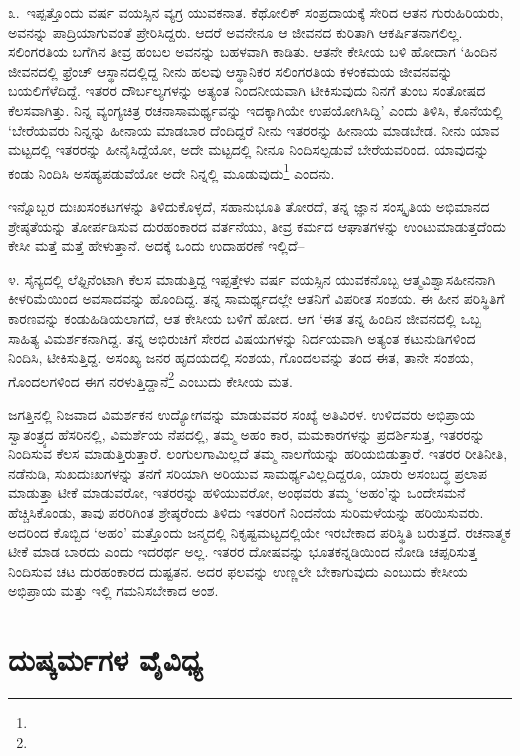 ೩.\ ಇಪ್ಪತ್ತೊಂದು ವರ್ಷ ವಯಸ್ಸಿನ ವ್ಯಗ್ರ ಯುವಕನಾತ. ಕೆಥೋಲಿಕ್ ಸಂಪ್ರದಾಯಕ್ಕೆ ಸೇರಿದ ಆತನ ಗುರುಹಿರಿಯರು, ಅವನನ್ನು ಪಾದ್ರಿಯಾಗುವಂತೆ ಪ್ರೇರಿಸಿದ್ದರು. ಆದರೆ ಅವನೇನೂ ಆ ಜೀವನದ ಕುರಿತಾಗಿ ಆಕರ್ಷಿತನಾಗಲಿಲ್ಲ. ಸಲಿಂಗರತಿಯ ಬಗೆಗಿನ ತೀವ್ರ ಹಂಬಲ ಅವನನ್ನು ಬಹಳವಾಗಿ ಕಾಡಿತು. ಆತನೇ ಕೇಸೀಯ ಬಳಿ ಹೋದಾಗ ‘ಹಿಂದಿನ ಜೀವನದಲ್ಲಿ ಫ್ರೆಂಚ್ ಆಸ್ಥಾನದಲ್ಲಿದ್ದ ನೀನು ಹಲವು ಆಸ್ಥಾನಿಕರ ಸಲಿಂಗರತಿಯ ಕಳಂಕಮಯ ಜೀವನವನ್ನು ಬಯಲಿಗೆಳೆದಿದ್ದೆ. ಇತರರ ದೌರ್ಬಲ್ಯಗಳನ್ನು ಅತ್ಯಂತ ನಿಂದನೀಯವಾಗಿ ಟೀಕಿಸುವುದು ನಿನಗೆ ತುಂಬ ಸಂತೋಷದ ಕೆಲಸವಾಗಿತ್ತು. ನಿನ್ನ ವ್ಯಂಗ್ಯಚಿತ್ರ ರಚನಾಸಾಮರ್ಥ್ಯವನ್ನು ಇದಕ್ಕಾಗಿಯೇ ಉಪಯೋಗಿಸಿದ್ದಿ’ ಎಂದು ತಿಳಿಸಿ, ಕೊನೆಯಲ್ಲಿ ‘ಬೇರೆಯವರು ನಿನ್ನನ್ನು ಹೀನಾಯ ಮಾಡಬಾರ ದೆಂದಿದ್ದರೆ ನೀನು ಇತರರನ್ನು ಹೀನಾಯ ಮಾಡಬೇಡ. ನೀನು ಯಾವ ಮಟ್ಟದಲ್ಲಿ ಇತರರನ್ನು ಹೀನೈಸಿದ್ದೆಯೋ, ಅದೇ ಮಟ್ಟದಲ್ಲಿ ನೀನೂ ನಿಂದಿಸಲ್ಪಡುವೆ ಬೇರೆಯವರಿಂದ. ಯಾವುದನ್ನು ಕಂಡು ನಿಂದಿಸಿ ಅಸಹ್ಯಪಡುವೆಯೋ ಅದೇ ನಿನ್ನಲ್ಲಿ ಮೂಡುವುದು\footnote{} ಎಂದನು.

ಇನ್ನೊಬ್ಬರ ದುಃಖಸಂಕಟಗಳನ್ನು ತಿಳಿದುಕೊಳ್ಳದೆ, ಸಹಾನುಭೂತಿ ತೋರದೆ, ತನ್ನ ಜ್ಞಾನ ಸಂಸ್ಕೃತಿಯ ಅಭಿಮಾನದ ಶ್ರೇಷ್ಠತೆಯನ್ನು ತೋರ್ಪಡಿಸುವ ದುರಹಂಕಾರದ ವರ್ತನೆಯು, ತೀವ್ರ ಕರ್ಮದ ಆಘಾತಗಳನ್ನು ಉಂಟುಮಾಡುತ್ತದೆಂದು ಕೇಸೀ ಮತ್ತೆ ಮತ್ತೆ ಹೇಳುತ್ತಾನೆ. ಅದಕ್ಕೆ ಒಂದು ಉದಾಹರಣೆ ಇಲ್ಲಿದೆ–

೪. ಸೈನ್ಯದಲ್ಲಿ ಲೆಫ್ಟಿನೆಂಟಾಗಿ ಕೆಲಸ ಮಾಡುತ್ತಿದ್ದ ಇಪ್ಪತ್ತೇಳು ವರ್ಷ ವಯಸ್ಸಿನ ಯುವಕನೊಬ್ಬ ಆತ್ಮವಿಶ್ವಾಸಹೀನನಾಗಿ ಕೀಳರಿಮೆಯಿಂದ ಅವಸಾದವನ್ನು ಹೊಂದಿದ್ದ. ತನ್ನ ಸಾಮರ್ಥ್ಯದಲ್ಲೇ ಆತನಿಗೆ ವಿಪರೀತ ಸಂಶಯ. ಈ ಹೀನ ಪರಿಸ್ಥಿತಿಗೆ ಕಾರಣವನ್ನು ಕಂಡುಹಿಡಿಯಲಾಗದೆ, ಆತ ಕೇಸೀಯ ಬಳಿಗೆ ಹೋದ. ಆಗ ‘ಈತ ತನ್ನ ಹಿಂದಿನ ಜೀವನದಲ್ಲಿ ಒಬ್ಬ ಸಾಹಿತ್ಯ ವಿಮರ್ಶಕನಾಗಿದ್ದ. ತನ್ನ ಅಭಿರುಚಿಗೆ ಸೇರದ ವಿಷಯಗಳನ್ನು ನಿರ್ದಯವಾಗಿ ಅತ್ಯಂತ ಕಟುನುಡಿಗಳಿಂದ ನಿಂದಿಸಿ, ಟೀಕಿಸುತ್ತಿದ್ದ. ಅಸಂಖ್ಯ ಜನರ ಹೃದಯದಲ್ಲಿ ಸಂಶಯ, ಗೊಂದಲವನ್ನು ತಂದ ಈತ, ತಾನೇ ಸಂಶಯ, ಗೊಂದಲಗಳಿಂದ ಈಗ ನರಳುತ್ತಿದ್ದಾನೆ\footnote{} ಎಂಬುದು ಕೇಸೀಯ ಮತ.

ಜಗತ್ತಿನಲ್ಲಿ ನಿಜವಾದ ವಿಮರ್ಶಕನ ಉದ್ಯೋಗವನ್ನು ಮಾಡುವವರ ಸಂಖ್ಯೆ ಅತಿವಿರಳ. ಉಳಿದವರು ಅಭಿಪ್ರಾಯ ಸ್ವಾತಂತ್ರ್ಯದ ಹೆಸರಿನಲ್ಲಿ, ವಿಮರ್ಶೆಯ ನೆಪದಲ್ಲಿ, ತಮ್ಮ ಅಹಂ ಕಾರ, ಮಮಕಾರಗಳನ್ನು ಪ್ರದರ್ಶಿಸುತ್ತ, ಇತರರನ್ನು ನಿಂದಿಸುವ ಕೆಲಸ ಮಾಡುತ್ತಿರುತ್ತಾರೆ. ಲಂಗುಲಗಾಮಿಲ್ಲದೆ ತಮ್ಮ ನಾಲಗೆಯನ್ನು ಹರಿಯಬಿಡುತ್ತಾರೆ. ಇತರರ ರೀತಿನೀತಿ, ನಡೆನುಡಿ, ಸುಖದುಃಖಗಳನ್ನು ತನಗೆ ಸರಿಯಾಗಿ ಅರಿಯುವ ಸಾಮರ್ಥ್ಯವಿಲ್ಲದಿದ್ದರೂ, ಯಾರು ಅಸಂಬದ್ಧ ಪ್ರಲಾಪ ಮಾಡುತ್ತಾ ಟೀಕೆ ಮಾಡುವರೋ, ಇತರರನ್ನು ಹಳಿಯುವರೋ, ಅಂಥವರು ತಮ್ಮ ‘ಅಹಂ’ನ್ನು ಒಂದೇಸಮನೆ ಹೆಚ್ಚಿಸಿಕೊಂಡು, ತಾವು ಪರರಿಗಿಂತ ಶ್ರೇಷ್ಠರೆಂದು ತಿಳಿದು ಇತರರಿಗೆ ನಿಂದನೆಯ ಸುರಿಮಳೆಯನ್ನು ಹರಿಯಿಸುವರು. ಅದರಿಂದ ಕೊಬ್ಬಿದ ‘ಅಹಂ’ ಮತ್ತೊಂದು ಜನ್ಮದಲ್ಲಿ ನಿಕೃಷ್ಟಮಟ್ಟದಲ್ಲಿಯೇ ಇರಬೇಕಾದ ಪರಿಸ್ಥಿತಿ ಬರುತ್ತದೆ. ರಚನಾತ್ಮಕ ಟೀಕೆ ಮಾಡ ಬಾರದು ಎಂದು ಇದರರ್ಥ ಅಲ್ಲ. ಇತರರ ದೋಷವನ್ನು ಭೂತಕನ್ನಡಿಯಿಂದ ನೋಡಿ ಚಪ್ಪರಿಸುತ್ತ ನಿಂದಿಸುವ ಚಟ ದುರಹಂಕಾರದ ದುಷ್ಟತನ. ಅದರ ಫಲವನ್ನು ಉಣ್ಣಲೇ ಬೇಕಾಗುವುದು ಎಂಬುದು ಕೇಸೀಯ ಅಭಿಪ್ರಾಯ ಮತ್ತು ಇಲ್ಲಿ ಗಮನಿಸಬೇಕಾದ ಅಂಶ.


\section*{ದುಷ್ಕರ್ಮಗಳ ವೈವಿಧ್ಯ}

